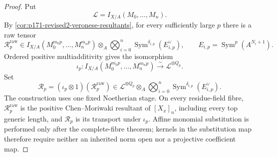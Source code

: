 \begin{proof}
Put
\[
 \mathscr L=I_{X/A}(M_0,\ldots,M_n).
\]
By \cref{cor:p171-revised2-veronese-resultants}, for every sufficiently
large \(p\) there is a raw tensor
\[
 \mathcal R_p^{\mathrm{raw}}\in
 I_{X/A}(M_0^{m_0p},\ldots,M_n^{m_np})\otimes_A
 \bigotimes_{i=0}^n
 \operatorname{Sym}^{\delta_{i,p}}(E_{i,p}^\vee),
 \qquad
 E_{i,p}=\operatorname{Sym}^p(A^{N_i+1}).
\]
Ordered positive multiadditivity gives the isomorphism
\[
 \iota_p:
 I_{X/A}(M_0^{m_0p},\ldots,M_n^{m_np})
 \xrightarrow{\sim}\mathscr L^{\otimes Q_p}.
\]
Set
\[
 \mathcal R_p=(\iota_p\otimes1)
  (\mathcal R_p^{\mathrm{raw}})
 \in\mathscr L^{\otimes Q_p}\otimes_A
 \bigotimes_{i=0}^n
 \operatorname{Sym}^{\delta_{i,p}}(E_{i,p}^\vee).
\]
The construction uses one fixed Noetherian stage.  On every residue-field
fibre,
\(\mathcal R_p^{\mathrm{raw}}\) is the positive Chen--Moriwaki resultant
\cite[Section~1.6]{ChenMoriwaki21AdelicIntersection} of \([X_x]_n\),
including every top generic length, and \(\mathcal R_p\)
is its transport under \(\iota_p\).  Affine monomial
substitution is performed only after the complete-fibre theorem; kernels
in the substitution map therefore require neither an inherited norm open
nor a projective coefficient map.


\end{proof}
